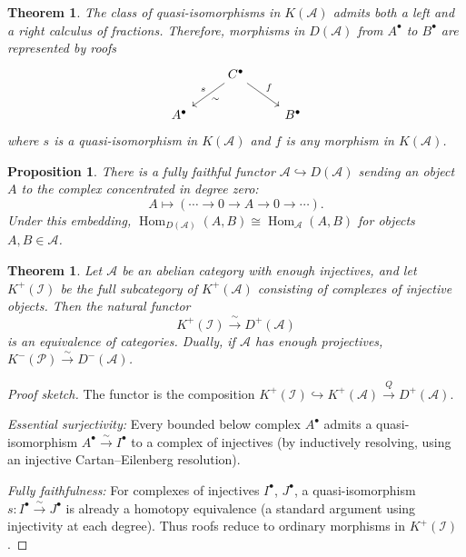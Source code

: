 \documentclass[a4paper,12pt]{book}
\DeclareMathOperator{\Hom}{Hom}
\theoremstyle{definition}
\theoremstyle{plain}
\newtheorem{theorem}[definition]{Theorem}
\newtheorem{proposition}[definition]{Proposition}
\theoremstyle{remark}
\begin{document}
\begin{theorem}\label{thm:derived-cat-roofs}
The class of quasi-isomorphisms in $K(\mathcal{A})$ admits both a left and a right calculus
of fractions. Therefore, morphisms in $D(\mathcal{A})$ from $A^\bullet$ to $B^\bullet$ are
represented by roofs
\[
\begin{tikzcd}
    & C^\bullet \arrow[dl, "s"', "\sim"] \arrow[dr, "f"] & \\
    A^\bullet & & B^\bullet
\end{tikzcd}
\]
where $s$ is a quasi-isomorphism in $K(\mathcal{A})$ and $f$ is any morphism in $K(\mathcal{A})$.
\end{theorem}

\begin{proposition}\label{prop:derived-cat-embedding}
There is a fully faithful functor $\mathcal{A} \hookrightarrow D(\mathcal{A})$ sending
an object $A$ to the complex concentrated in degree zero:
\[
    A \mapsto (\cdots \to 0 \to A \to 0 \to \cdots).
\]
Under this embedding, $\Hom_{D(\mathcal{A})}(A, B) \cong \Hom_{\mathcal{A}}(A, B)$
for objects $A, B \in \mathcal{A}$.
\end{proposition}

\begin{theorem}\label{thm:injective-resolution-equiv}
Let $\mathcal{A}$ be an abelian category with enough injectives, and let
$K^+(\mathcal{I})$ be the full subcategory of $K^+(\mathcal{A})$ consisting of
complexes of injective objects. Then the natural functor
\[
    K^+(\mathcal{I}) \xrightarrow{\;\sim\;} D^+(\mathcal{A})
\]
is an equivalence of categories. Dually, if $\mathcal{A}$ has enough projectives,
$K^-(\mathcal{P}) \xrightarrow{\sim} D^-(\mathcal{A})$.
\end{theorem}

\begin{proof}[Proof sketch]
The functor is the composition $K^+(\mathcal{I}) \hookrightarrow K^+(\mathcal{A})
\xrightarrow{Q} D^+(\mathcal{A})$.

\textit{Essential surjectivity:} Every bounded below complex $A^\bullet$ admits a
quasi-isomorphism $A^\bullet \xrightarrow{\sim} I^\bullet$ to a complex of injectives
(by inductively resolving, using an injective Cartan--Eilenberg resolution).

\textit{Fully faithfulness:} For complexes of injectives $I^\bullet$, $J^\bullet$,
a quasi-isomorphism $s \colon I^\bullet \xrightarrow{\sim} J^\bullet$ is already a
homotopy equivalence (a standard argument using injectivity at each degree).
Thus roofs reduce to ordinary morphisms in $K^+(\mathcal{I})$.
\end{proof}
\end{document}
